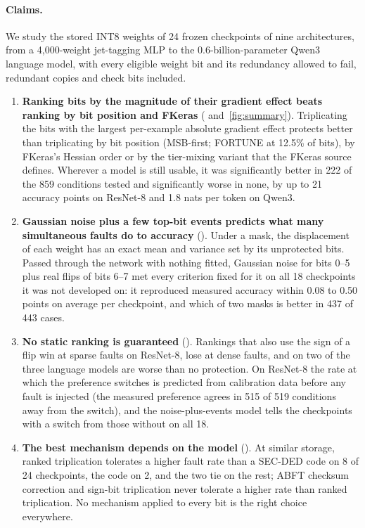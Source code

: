 \paragraph{Claims.} We study the stored INT8 weights of 24 frozen checkpoints of nine architectures, from a 4,000-weight jet-tagging MLP to the 0.6-billion-parameter Qwen3 language model, with every eligible weight bit and its redundancy allowed to fail, redundant copies and check bits included.
\begin{enumerate}
\item \textbf{Ranking bits by the magnitude of their gradient effect beats ranking by bit position and FKeras} ( and~\ref{fig:summary}). Triplicating the bits with the largest per-example absolute gradient effect protects better than triplicating by bit position (MSB-first; FORTUNE at 12.5\% of bits), by FKeras's Hessian order or by the tier-mixing variant that the FKeras source defines. Wherever a model is still usable, it was significantly better in 222 of the 859 conditions tested and significantly worse in none, by up to 21 accuracy points on ResNet-8 and 1.8 nats per token on Qwen3.
\item \textbf{Gaussian noise plus a few top-bit events predicts what many simultaneous faults do to accuracy} (). Under a mask, the displacement of each weight has an exact mean and variance set by its unprotected bits. Passed through the network with nothing fitted, Gaussian noise for bits 0--5 plus real flips of bits 6--7 met every criterion fixed for it on all 18 checkpoints it was not developed on: it reproduced measured accuracy within 0.08 to 0.50 points on average per checkpoint, and which of two masks is better in 437 of 443 cases.
\item \textbf{No static ranking is guaranteed} (). Rankings that also use the sign of a flip win at sparse faults on ResNet-8, lose at dense faults, and on two of the three language models are worse than no protection. On ResNet-8 the rate at which the preference switches is predicted from calibration data before any fault is injected (the measured preference agrees in 515 of 519 conditions away from the switch), and the noise-plus-events model tells the checkpoints with a switch from those without on all 18.
\item \textbf{The best mechanism depends on the model} (). At similar storage, ranked triplication tolerates a higher fault rate than a SEC-DED code on 8 of 24 checkpoints, the code on 2, and the two tie on the rest; ABFT checksum correction and sign-bit triplication never tolerate a higher rate than ranked triplication. No mechanism applied to every bit is the right choice everywhere.
\end{enumerate}


